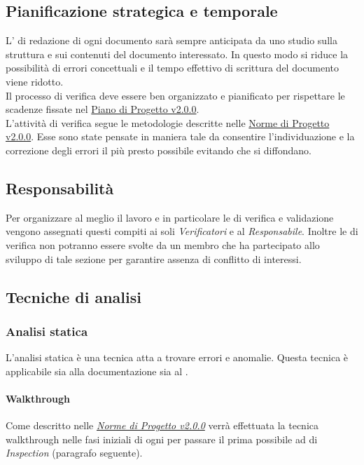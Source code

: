 \documentclass{scalatekids-article}
\begin{document}
\subsection{Pianificazione strategica e temporale}
L' di redazione di ogni documento sarà sempre anticipata da uno studio sulla struttura e sui contenuti del documento interessato. In questo modo si riduce la possibilità di errori concettuali e il tempo effettivo di scrittura del documento viene ridotto.\\
Il processo di verifica deve essere ben organizzato e pianificato per rispettare le scadenze fissate nel \href{run:./PianoDiProgetto\_v2.0.0.pdf}{Piano di Progetto v2.0.0}.\\
L'attività di verifica segue le metodologie descritte nelle \href{run:../Interni/NormeDiProgetto\_v2.0.0.pdf}{Norme di Progetto v2.0.0}. Esse sono state pensate in maniera tale da consentire l'individuazione e la correzione degli errori il più presto possibile evitando che si diffondano.
\subsection{Responsabilità}
Per organizzare al meglio il lavoro e in particolare le  di verifica e validazione vengono assegnati questi compiti ai soli \textit{Verificatori} e al \textit{Responsabile}. Inoltre le  di verifica non potranno essere svolte da un membro che ha partecipato allo sviluppo di tale sezione per garantire assenza di conflitto di interessi.
\subsection{Tecniche di analisi}
\label{sec:TecnicheDiAnalisi}
\subsubsection{Analisi statica}
L'analisi statica è una tecnica atta a trovare errori e anomalie. Questa tecnica è applicabile sia alla documentazione sia al .
\paragraph{Walkthrough}
\label{sec:walkthrough}Come descritto nelle \textit{\href{run:../Interni/NormeDiProgetto_v2.0.0.pdf}{Norme di Progetto v2.0.0}} verrà effettuata la tecnica walkthrough nelle fasi iniziali di ogni  per passare il prima possibile ad  di \textit{Inspection} (paragrafo seguente).
\end{document}
